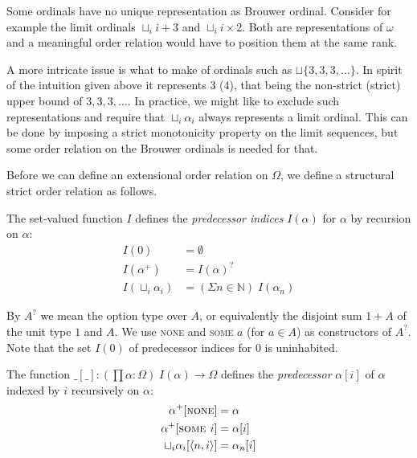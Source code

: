 Some ordinals have no unique representation as Brouwer ordinal. Consider for
example the limit ordinals $\sqcup_i i + 3$ and $\sqcup_i i \times 2$. Both
are representations of $\omega$ and a meaningful order relation would have to
position them at the same rank.

A more intricate issue is what to make of ordinals such as $\sqcup \{ 3, 3, 3,
\ldots \}$. In spirit of the intuition given above it represents $3$ ($4$),
that being the non-strict (strict) upper bound of $3, 3, 3, \ldots$.
In practice, we might like to exclude such representations and require that
$\sqcup_i \alpha_i$ always represents a limit ordinal. This can be done by
imposing a strict monotonicity property on the limit sequences, but some order
relation on the Brouwer ordinals is needed for that.


Before we can define an extensional order relation on $\Omega$, we define a
structural strict order relation as follows.

\begin{definition}
The set-valued function $I$ defines the \emph{predecessor indices} $I(\alpha)$
for $\alpha$ by recursion on $\alpha$:
\begin{align*}
  I(0)                 &= \emptyset \\
  I(\alpha^+)          &= I(\alpha)^? \\
  I(\sqcup_i \alpha_i) &= (\Sigma n \in \mathbb{N}) \; I(\alpha_n)
\end{align*}
\end{definition}


By $A^?$ we mean the option type over $A$, or equivalently the disjoint sum
$1 + A$ of the unit type $1$ and $A$. We use \textsc{none} and \textsc{some
  $a$} (for $a \in A$) as constructors of $A^?$. Note that the set $I(0)$ of
predecessor indices for $0$ is uninhabited.

\begin{definition}[Predecessor]
The function $\_[\_] : (\prod \alpha : \Omega) \; I(\alpha) \rightarrow
\Omega$ defines the \emph{predecessor} $\alpha[i]$ of $\alpha$ indexed by $i$
recursively on $\alpha$:
\begin{align*}
  \alpha^+[\textsc{none}]                 &= \alpha \\
  \alpha^+[\textsc{some $i$}]             &= \alpha[i] \\
  \sqcup_i \alpha_i[\langle n, i \rangle] &= \alpha_n[i]
\end{align*}
\end{definition}

